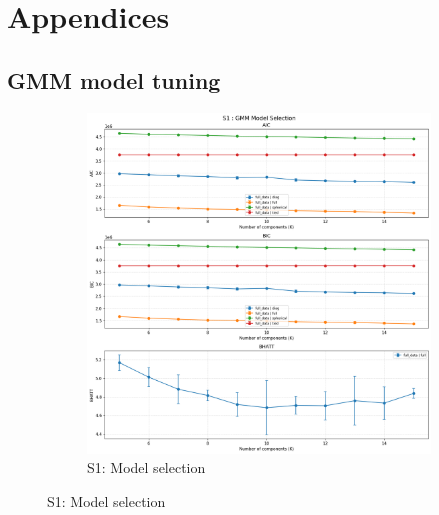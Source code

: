 \section{Appendices}
\begin{appendices}

\section{GMM model tuning}


\begin{figure}[htbp]
  \centering

  \begin{subfigure}[t]{\textwidth}
    \centering
    \includegraphics[width=\textwidth]{figures/appendix/S1_gmm_model_selection.png}
    \caption{S1: Model selection}
    \label{fig:s1_sel}
  \end{subfigure}

  \medskip


\end{figure}
\end{appendices}
